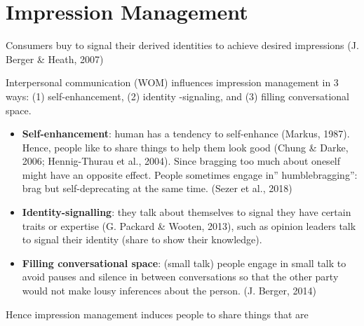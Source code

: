 \documentclass[
]{book}
\providecommand{\tightlist}{%
  \setlength{\itemsep}{0pt}\setlength{\parskip}{0pt}}
\begin{document}
\hypertarget{impression-management}{%
\section{Impression Management}\label{impression-management}}

Consumers buy to signal their derived identities to achieve desired impressions (J. Berger \& Heath, 2007)

Interpersonal communication (WOM) influences impression management in 3 ways: (1) self-enhancement, (2) identity -signaling, and (3) filling conversational space.

\begin{itemize}
\tightlist
\item
  \textbf{Self-enhancement}: human has a tendency to self-enhance (Markus, 1987). Hence, people like to share things to help them look good (Chung \& Darke, 2006; Hennig-Thurau et al., 2004). Since bragging too much about oneself might have an opposite effect. People sometimes engage in'' humblebragging'': brag but self-deprecating at the same time. (Sezer et al., 2018)\\
\item
  \textbf{Identity-signalling}: they talk about themselves to signal they have certain traits or expertise (G. Packard \& Wooten, 2013), such as opinion leaders talk to signal their identity (share to show their knowledge).\\
\item
  \textbf{Filling conversational space}: (small talk) people engage in small talk to avoid pauses and silence in between conversations so that the other party would not make lousy inferences about the person. (J. Berger, 2014)
\end{itemize}

Hence impression management induces people to share things that are
\end{document}
